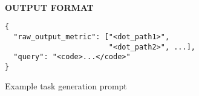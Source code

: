 \begin{figure}[!th]
\begin{tcolorbox}
\hrulefill \\
\textbf{OUTPUT FORMAT}
\begin{verbatim}
{
  "raw_output_metric": ["<dot_path1>",
                        "<dot_path2>", ...],
  "query": "<code>...</code>"
}
\end{verbatim}

  \end{tcolorbox}
  \caption{Example task generation prompt}
  \label{fig:sample_task_prompt}
\end{figure}